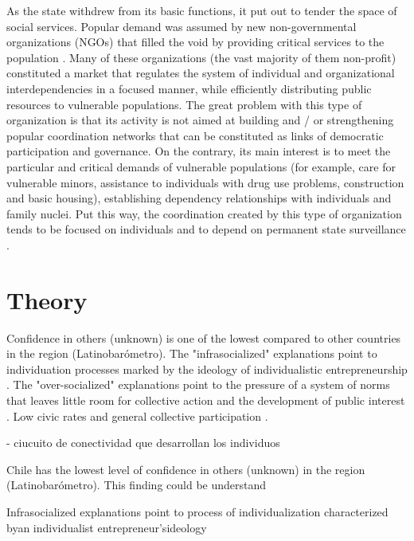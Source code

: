 As the state withdrew from its basic functions, it put out to tender the space of social services. Popular demand was assumed by new non-governmental organizations (NGOs) that filled the void by providing critical services to the population  \parencite{boulding_community_2020, holzner_poverty_2007}. Many of these organizations (the vast majority of them non-profit) constituted a market that regulates the system of individual and organizational interdependencies in a focused manner, while efficiently distributing public resources to vulnerable populations. The great problem with this type of organization is that its activity is not aimed at building and / or strengthening popular coordination networks that can be constituted as links of democratic participation and governance. On the contrary, its main interest is to meet the particular and critical demands of vulnerable populations (for example, care for vulnerable minors, assistance to individuals with drug use problems, construction and basic housing), establishing dependency relationships with individuals and family nuclei. Put this way, the coordination created by this type of organization tends to be focused on individuals and to depend on permanent state surveillance \parencite{delamaza_redes_2012}.
\bigskip


\section{Theory}

Confidence in others (unknown) is one of the lowest compared to other countries in the region (Latinobarómetro). The "infrasocialized" explanations point to individuation processes marked by the ideology of individualistic entrepreneurship \parencite{araujo_desafios_2012, yopo_individualizacion_2013}. The "over-socialized" explanations point to the pressure of a system of norms that leaves little room for collective action and the development of public interest \parencite{oxhorn_neopluralism_2004}. Low civic rates and general collective participation \parencite{espinoza_capital_2009}.

- ciucuito de conectividad que desarrollan los individuos 


Chile has the lowest level of confidence in others (unknown) in the region (Latinobarómetro). This finding could be understand 

Infrasocialized explanations point to process of individualization characterized byan individualist entrepreneur'sideology

